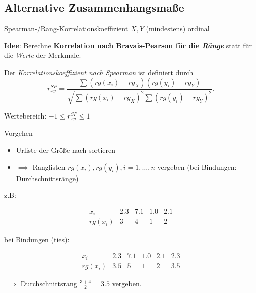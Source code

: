 \documentclass[
  10pt,
  ignorenonframetext,
]{beamer}
\providecommand{\tightlist}{%
  \setlength{\itemsep}{0pt}\setlength{\parskip}{0pt}}
\begin{document}
\hypertarget{alternative-zusammenhangsmauxdfe}{%
\subsection{Alternative
Zusammenhangsmaße}\label{alternative-zusammenhangsmauxdfe}}

\begin{frame}{Spearman-/Rang-Korrelationskoeffizient}
\protect\hypertarget{spearman-rang-korrelationskoeffizient}{}
\(X, Y\) (mindestens) ordinal

\textbf{Idee}: Berechne \textbf{Korrelation nach Bravais-Pearson für die
\emph{Ränge}} statt für die \emph{Werte} der Merkmale.

Der \textit{Korrelationskoeffizient nach Spearman} ist definiert durch
\begin{displaymath}
r^{SP}_{xy} = \frac{\sum(rg(x_i)-\bar{rg}_X)(rg(y_i) - \bar{rg}_Y)}
{\sqrt{\sum(rg(x_i)-\bar{rg}_X)^2\sum(rg(y_i)-\bar{rg}_Y)^2}}.
\end{displaymath}

Wertebereich: \(-1 \le r^{SP}_{xy} \le 1\)
\end{frame}

\begin{frame}{Vorgehen}
\protect\hypertarget{vorgehen}{}
\begin{itemize}
\tightlist
\item
  Urliste der Größe nach sortieren
\item
  \(\implies\) Ranglisten \(rg(x_i), rg(y_i), i = 1,\ldots,n\) vergeben
  (bei Bindungen: Durchschnittsränge)
\end{itemize}

z.B:

\[
\begin{array}{cccccc}
x_i & 2.3 & 7.1 & 1.0 & 2.1\\
rg(x_i) & 3 & 4 & 1 & 2
\end{array}
\]

bei Bindungen (ties):

\[
\begin{array}{cccccc}
x_i & 2.3 & 7.1 & 1.0 & 2.1 & 2.3\\
rg(x_i) & 3.5 & 5 & 1 & 2 & 3.5
\end{array}
\]

\(\implies\) Durchschnittsrang \(\frac{3+4}{2} = 3.5\) vergeben.
\end{frame}
\end{document}
